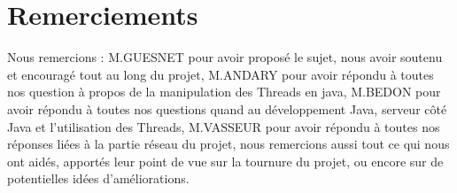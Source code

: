 \section*{Remerciements}

Nous remercions : \newline
	M.GUESNET pour avoir proposé le sujet, nous avoir soutenu et encouragé tout au long du projet,\newline
	M.ANDARY pour avoir répondu à toutes nos question à propos de la manipulation des Threads en java,\newline
	M.BEDON pour avoir répondu à toutes nos questions quand au développement Java, serveur côté Java et l'utilisation des Threads,\newline
	M.VASSEUR pour avoir répondu à toutes nos réponses liées à la partie réseau du projet,\newline
	nous remercions aussi tout ce qui nous ont aidés, apportés leur point de vue sur la tournure du projet, ou encore sur de potentielles idées d'améliorations.
